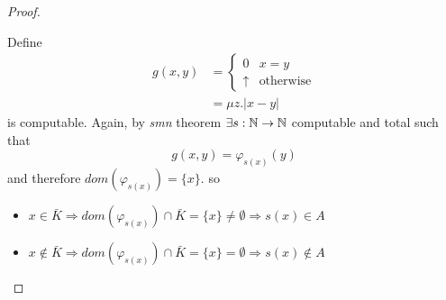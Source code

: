 \begin{observation}
\begin{proof}
\begin{enumerate}
      Define
      \begin{align*}
        g(x,y) &= \begin{cases}
          0        & x=y \\
          \uparrow & \mbox{otherwise}
        \end{cases} \\
        &= \mu z . |x-y|
      \end{align*}
      is computable. Again,
      by \emph{smn} theorem $\exists s : \mathbb{N} \to \mathbb{N}$ computable and total
      such that
      \[
        g(x,y) = \varphi_{s(x)}(y)
      \]
      and therefore $dom(\varphi_{s(x)}) = \{x\}$. so
      \begin{itemize}
      \item
        \(x \in \bar{K} \Rightarrow dom(\varphi_{s(x)}) \cap \bar{K} =
        \{x\} \neq \emptyset \Rightarrow s(x) \in A\)
      \item
        \(x \notin \bar{K} \Rightarrow dom(\varphi_{s(x)}) \cap \bar{K}
        = \{x\} = \emptyset \Rightarrow s(x) \notin A\)
      \end{itemize}
    \end{enumerate}
  \end{proof}
\end{observation}


